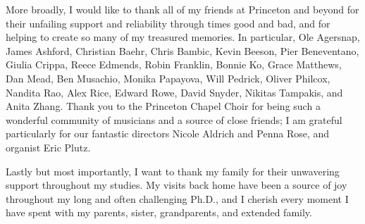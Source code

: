 More broadly, I would like to thank all of my friends at Princeton and beyond
for their unfailing support and reliability through times good and bad, and for
helping to create so many of my treasured memories. In particular,
Ole Agersnap, James Ashford, Christian Baehr,
Chris Bambic, Kevin Beeson, Pier Beneventano, Giulia Crippa, Reece
Edmends, Robin Franklin, Bonnie Ko,
Grace Matthews, Dan Mead, Ben Musachio, Monika
Papayova, Will Pedrick, Oliver Philcox,
Nandita Rao, Alex Rice, Edward Rowe, David Snyder,
Nikitas Tampakis, and Anita Zhang.
Thank you to the Princeton Chapel Choir for being such a wonderful
community of musicians and a source of close friends; I am
grateful particularly for our fantastic directors Nicole Aldrich
and Penna Rose, and organist Eric Plutz.

Lastly but most importantly, I want to thank my family for their unwavering
support throughout my studies. My visits back home have been a source of joy
throughout my long and often challenging Ph.D., and I cherish every moment I
have spent with my parents, sister, grandparents, and extended family.
